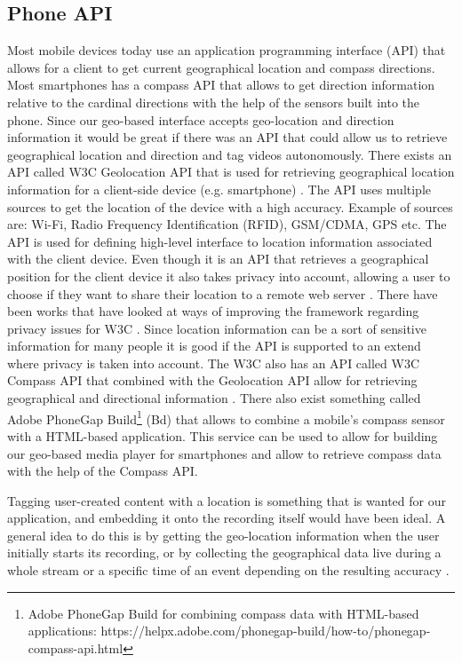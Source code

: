 \subsection{Phone API}
\label{sec:phoneapi}
Most mobile devices today use an application programming interface (API) that allows for a client to get current geographical location and compass directions. Most smartphones has a compass API that allows to get direction information relative to the cardinal directions with the help of the sensors built into the phone. Since our geo-based interface accepts geo-location and direction information it would be great if there was an API that could allow us to retrieve geographical location and direction and tag videos autonomously. There exists an API called W3C Geolocation API that is used for retrieving geographical location information for a client-side device (e.g. smartphone) \cite{geoapi}. The API uses multiple sources to get the location of the device with a high accuracy. Example of sources are: Wi-Fi, Radio Frequency Identification (RFID), GSM/CDMA, GPS etc. The API is used for defining high-level interface to location information associated with the client device. Even though it is an API that retrieves a geographical position for the client device it also takes privacy into account, allowing a user to choose if they want to share their location to a remote web server \cite{usesofgeo}. There have been works that have looked at ways of improving the framework regarding privacy issues for W3C \cite{privacyissues}. Since location information can be a sort of sensitive information for many people it is good if the API is supported to an extend where privacy is taken into account. The W3C also has an API called W3C Compass API that combined with the Geolocation API allow for retrieving geographical and directional information \cite{compassapi}. There also exist something called Adobe PhoneGap Build\footnote{Adobe PhoneGap Build for combining compass data with HTML-based applications: https://helpx.adobe.com/phonegap-build/how-to/phonegap-compass-api.html} (Bd) that allows to combine a mobile’s compass sensor with a HTML-based application. This service can be used to allow for building our geo-based media player for smartphones and allow to retrieve compass data with the help of the Compass API.

Tagging user-created content with a location is something that is wanted for our application, and embedding it onto the recording itself would have been ideal. A general idea to do this is by getting the geo-location information when the user initially starts its recording, or by collecting the geographical data live during a whole stream or a specific time of an event depending on the resulting accuracy \cite{locationstrategies}.


